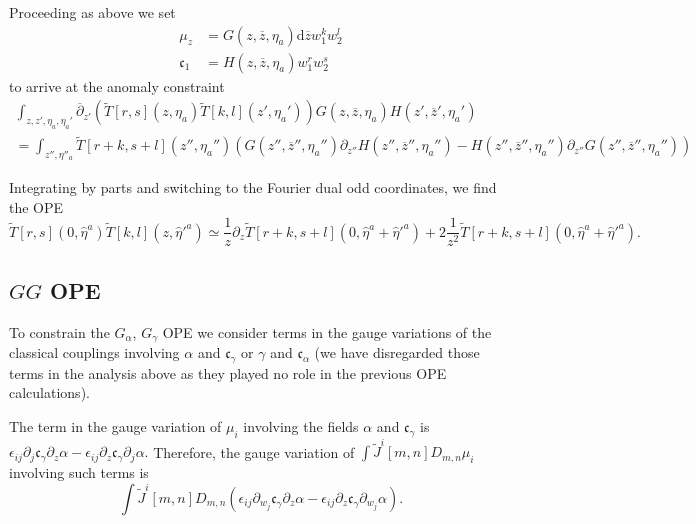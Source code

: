 \documentclass[11pt]{amsart}
\newcommand{\dbar}{\br{\partial}}
\newcommand{\zbar}{\br{z}}
\newcommand{\what}{\widehat}
\newcommand{\til}{\widetilde}
\newcommand{\br}{\overline}
\newcommand{\mf}{\mathfrak}
\renewcommand{\d}{\mathrm{d}}
\theoremstyle{thm}
\numberwithin{equation}{subsection}
\theoremstyle{def}
\theoremstyle{rem}
\newcommand{\fc}{\mf{c}}
\begin{document}
Proceeding as above we set
\begin{align*}
\mu_z & = G(z,\zbar,\eta_a) \d \zbar w_1^k w_2^l \\
\mf{c}_1 & = H(z,\zbar,\eta_a) w_1^r w_2^s
\end{align*}
to arrive at the anomaly constraint
\begin{multline}
\int_{z,z',\eta_a,\eta_a'} \dbar_{z'} \left(\til{T}[r,s](z,\eta_a) \til{T}[k,l](z',\eta_a') \right) G(z,\zbar,\eta_a) H(z',\zbar',\eta_a') \\
= \int_{z'',\eta''_a} \til{T} [r+k, s+l]  (z'', \eta_a'') \left(G(z'',\zbar'', \eta_a'') \partial_{z''} H(z'', \zbar'', \eta_a'') - H(z'', \zbar'', \eta_a'') \partial_{z''} G(z'',\zbar'', \eta_a'') \right) 
\end{multline}

Integrating by parts and switching to the Fourier dual odd coordinates, we find the OPE 
\begin{equation}\label{ope:TT}
\til{T}[r,s] (0,\what\eta^a) \til{T}[k,l] (z, \what\eta'^a) \simeq \frac1z \partial_z \til{T}[r+k, s+l]  (0,\what\eta^a + \what\eta'^a) + 2 \frac{1}{z^2} \til{T}[r+k, s+l]  (0,\what\eta^a + \what\eta'^a) .
\end{equation}

\subsection{$GG$ OPE}
To constrain the $G_\alpha$, $G_\gamma$ OPE we consider terms in the gauge variations of the classical couplings involving $\alpha$ and $\fc_\gamma$ or $\gamma$ and $\fc_\alpha$ (we have disregarded those terms in the analysis above as they played no role in the previous OPE calculations).

The term in the gauge variation of $\mu_i$ involving the fields $\alpha$ and $\fc_\gamma$ is $\epsilon_{ij} \partial_j \fc_\gamma \partial_z \alpha - \epsilon_{ij} \partial_z \fc_\gamma \partial_j \alpha.$
Therefore, the gauge variation of $\int \til{J}^i [m,n] D_{m,n} \mu_i$ involving such terms is
\[
\int \til{J}^i [m,n] D_{m,n} \left( \epsilon_{ij} \partial_{w_j} \fc_\gamma \partial_z \alpha - \epsilon_{ij} \partial_z \fc_\gamma \partial_{w_j} \alpha \right) .
\]
\end{document}
